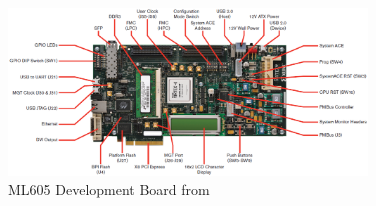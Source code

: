 \begin{figure}[htbp]
    \centering
    \includegraphics[width=0.85\textwidth]{./figures/ml605}
    \caption{ ML605 Development Board from \cite{xilinx:ml605}
    \label{fig:ml605}}
\end{figure}
\clearpage


